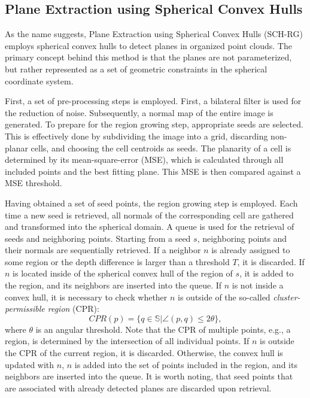 \documentclass[main.tex]{subfiles}
\begin{document}
\subsection{Plane Extraction using Spherical Convex Hulls}
As the name suggests, Plane Extraction using Spherical Convex Hulls (SCH-RG) employs spherical convex hulls to 
detect planes in organized point clouds.
The primary concept behind this method is that the planes are not parameterized, but rather represented as 
a set of geometric constraints in the spherical coordinate system.

First, a set of pre-processing steps is employed.
First, a bilateral filter is used for the reduction of noise. Subsequently, a normal map of the entire image 
is generated.
To prepare for the region growing step, appropriate seeds are selected. This is effectively done by subdividing the 
image into a grid, discarding non-planar cells, and choosing the cell centroids as seeds.
The planarity of a cell is determined by its mean-square-error (MSE), which is calculated through all included 
points and the best fitting plane. This MSE is then compared against a MSE threshold.

Having obtained a set of seed points, the region growing step is employed. 
Each time a new seed is retrieved, all normals of the corresponding cell are gathered and transformed 
into the spherical domain. A queue is used for the retrieval of seeds and neighboring points.
Starting from a seed $s$, neighboring points and their normals are sequentially retrieved. 
If a neighbor $n$ is already assigned to some region or the depth difference is larger than a threshold $T$, it is 
discarded. If $n$ is located inside of the spherical convex hull of the region of $s$, 
it is added to the region, and its neighbors are inserted into the queue. If $n$ is not inside a 
convex hull, it is necessary to check whether $n$ is outside of the so-called \textit{cluster-permissible region} (CPR):
\begin{equation}
    CPR(p) = \{q \in \mathbb{S} | \angle(p,q)\leq 2\theta\},
\end{equation}
where $\theta$ is an angular threshold. Note that the CPR of multiple points, e.g., a region, is determined by 
the intersection of all individual points.
If $n$ is outside the CPR of the current region, it is discarded. Otherwise, the convex hull is updated with $n$,
$n$ is added into the set of points included in the region, and its neighbors are inserted into the queue.
It is worth noting, that seed points that are associated with already detected planes are discarded upon retrieval.
\end{document}
